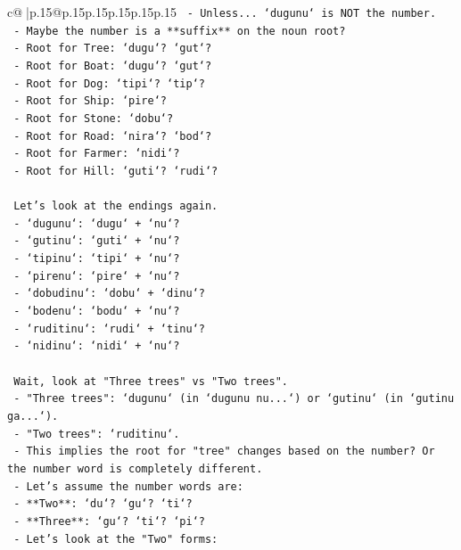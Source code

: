 \documentclass{article}
\begin{document}
{\begin{supertabular}{c@{$\;$}|p{.15\linewidth}@{}p{.15\linewidth}p{.15\linewidth}p{.15\linewidth}p{.15\linewidth}p{.15\linewidth}}
{{{\texttt{   {-} Unless... `dugunu` is NOT the number.} \\
\texttt{   {-} Maybe the number is a **suffix** on the noun root?} \\
\texttt{     {-} Root for Tree: `dugu`? `gut`?} \\
\texttt{     {-} Root for Boat: `dugu`? `gut`?} \\
\texttt{     {-} Root for Dog: `tipi`? `tip`?} \\
\texttt{     {-} Root for Ship: `pire`?} \\
\texttt{     {-} Root for Stone: `dobu`?} \\
\texttt{     {-} Root for Road: `nira`? `bod`?} \\
\texttt{     {-} Root for Farmer: `nidi`?} \\
\texttt{     {-} Root for Hill: `guti`? `rudi`?} \\
\\ 
\texttt{   Let's look at the endings again.} \\
\texttt{   {-} `dugunu`: `dugu` + `nu`?} \\
\texttt{   {-} `gutinu`: `guti` + `nu`?} \\
\texttt{   {-} `tipinu`: `tipi` + `nu`?} \\
\texttt{   {-} `pirenu`: `pire` + `nu`?} \\
\texttt{   {-} `dobudinu`: `dobu` + `dinu`?} \\
\texttt{   {-} `bodenu`: `bodu` + `nu`?} \\
\texttt{   {-} `ruditinu`: `rudi` + `tinu`?} \\
\texttt{   {-} `nidinu`: `nidi` + `nu`?} \\
\\ 
\texttt{   Wait, look at "Three trees" vs "Two trees".} \\
\texttt{   {-} "Three trees": `dugunu` (in `dugunu nu...`) or `gutinu` (in `gutinu ga...`).} \\
\texttt{   {-} "Two trees": `ruditinu`.} \\
\texttt{   {-} This implies the root for "tree" changes based on the number? Or the number word is completely different.} \\
\texttt{   {-} Let's assume the number words are:} \\
\texttt{     {-} **Two**: `du`? `gu`? `ti`?} \\
\texttt{     {-} **Three**: `gu`? `ti`? `pi`?} \\
\texttt{   {-} Let's look at the "Two" forms:} \\
}}}
\end{supertabular}}
\end{document}

